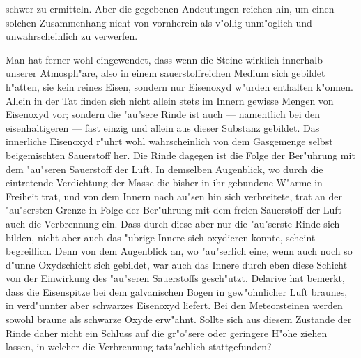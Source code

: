 \documentclass[a4paper, 8pt, oneside, polutonikogreek, german]{article}
\begin{document}
schwer zu ermitteln. Aber die gegebenen Andeutungen reichen hin, um einen solchen Zusammenhang nicht von vornherein als v"ollig unm"oglich und unwahrscheinlich zu verwerfen.

Man hat ferner wohl eingewendet, dass wenn die Steine wirklich innerhalb unserer Atmosph"are, also in einem sauerstoffreichen Medium sich gebildet h"atten, sie kein reines Eisen, sondern nur Eisenoxyd w"urden enthalten k"onnen. Allein in der Tat finden sich nicht allein stets im Innern gewisse Mengen von Eisenoxyd vor; sondern die "au"sere Rinde ist auch --- namentlich bei den eisenhaltigeren --- fast einzig und allein aus dieser Substanz gebildet. Das innerliche Eisenoxyd r"uhrt wohl wahrscheinlich von dem Gasgemenge selbst beigemischten Sauerstoff her. Die Rinde dagegen ist die Folge der Ber"uhrung mit dem "au"seren Sauerstoff der Luft. In demselben Augenblick, wo durch die eintretende Verdichtung der Masse die bisher in ihr gebundene W"arme in Freiheit trat, und von dem Innern nach au"sen hin sich verbreitete, trat an der "au"sersten Grenze in Folge der Ber"uhrung mit dem freien Sauerstoff der Luft auch die Verbrennung ein. Dass durch diese aber nur die "au"serste Rinde sich bilden, nicht aber auch das "ubrige Innere sich oxydieren konnte, scheint begreiflich. Denn von dem Augenblick an, wo "au"serlich eine, wenn auch noch so d"unne Oxydschicht sich gebildet, war auch das Innere durch eben diese Schicht von der Einwirkung des "au"seren Sauerstoffs gesch"utzt. Delarive hat bemerkt, dass die Eisenspitze bei dem galvanischen Bogen in gew"ohnlicher Luft braunes, in verd"unnter aber schwarzes Eisenoxyd liefert. Bei den Meteorsteinen werden sowohl braune als schwarze Oxyde erw"ahnt. Sollte sich aus diesem Zustande der Rinde daher nicht ein Schluss auf die gr"o"sere oder geringere H"ohe ziehen lassen, in welcher die Verbrennung tats"achlich stattgefunden?
\end{document}
